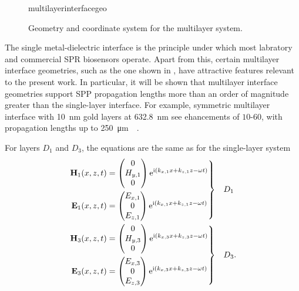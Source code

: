 \begin{figure}[ht]
\centering
{multilayerinterfacegeo}
\caption{Geometry and coordinate system for the multilayer system. }
\label{fig:multilayergeo}
\end{figure}

The single metal-dielectric interface is the principle under which most
labratory and commercial SPR biosensors operate.  Apart from this, certain
multilayer interface geometries, such as the one shown in
, have attractive features relevant to the
present work.  In particular, it will be shown that multilayer interface
geometries support SPP propagation lengths more than an order of magnitude
greater than the single-layer interface.  For example, symmetric multilayer
interface with \SI{10}{\nano\meter} gold layers at \SI{632.8}{\nano\meter}
see ehancements of $10$-$60$, with propagation lengths up to
\SI{250}{\micro\meter}~\cite{kuwamura1983experimental}~\cite{craig1983experimental}.

For layers $D_1$ and $D_3$, the equations are the same as for the single-layer system
\begin{align}
\left.\begin{aligned}
\mathbf{H}_1(x,z,t) &=
\begin{pmatrix}
0\\
H_{y,1}\\
0
\end{pmatrix} {\mathrm{e}}^{{\mathrm{i}}(k_{x,1}x+k_{z,1}z-\omega t)}\\
\mathbf{E}_1(x,z,t) &=
\begin{pmatrix}
E_{x,1}\\
0\\
E_{z,1}\\
\end{pmatrix} {\mathrm{e}}^{{\mathrm{i}}(k_{x,1}x+k_{z,1}z-\omega t)}
\end{aligned}
\right\}& \quad D_1\label{eqn:lrsppplanewavedielectric}\\
\left.\begin{aligned}
\mathbf{H}_3(x,z,t) &=
\begin{pmatrix}
0\\
H_{y,3}\\
0
\end{pmatrix}
{\mathrm{e}}^{{\mathrm{i}}(k_{x,3}x+k_{z,3}z-\omega t)}\\
\mathbf{E}_3(x,z,t) &=
\begin{pmatrix}
E_{x,3}\\
0\\
E_{z,3}\\
\end{pmatrix}
{\mathrm{e}}^{{\mathrm{i}}(k_{x,3}x+k_{z,3}z-\omega t)}
\end{aligned} 
\right\}&\quad D_3.
\label{eqn:lrsppplanewavemetal}
\end{align}

